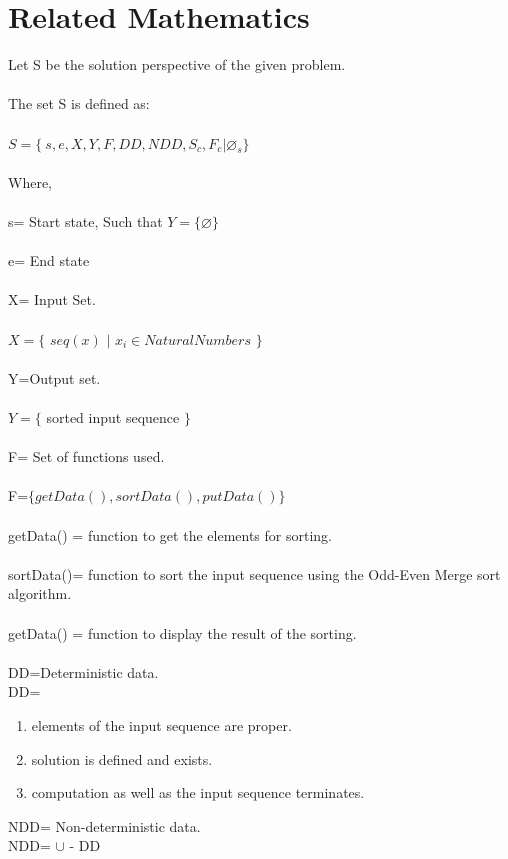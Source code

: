 \documentclass[10pt,a4paper]{article}
\begin{document}
\section{Related Mathematics}
Let S be the solution perspective of the given problem.
\\\\The set S is defined as:
\\\\$S=\lbrace\ s,e,X,Y,F,DD,NDD,S_{c},F_{c}|\varnothing_{s}\rbrace$
\\\\Where,
\\\\s= Start state,  Such that $Y=\lbrace \varnothing \rbrace$ 
\\\\e= End state 
\\\\X= Input Set.
\\\\$X=\lbrace$ $seq(x)$ $\mid$ $x_i \in Natural Numbers$ $\rbrace$
\\\\Y=Output set.
\\\\$Y=\lbrace $ sorted input sequence $ \rbrace $
\\\\F= Set of functions used.
\\\\F=$\lbrace getData(), sortData(), putData() \rbrace$
\\\\getData() = function to get the elements for sorting.
\\\\sortData()= function to sort the input sequence using the Odd-Even Merge sort algorithm.
\\\\getData() = function to display the result of the sorting.
\\\\DD=Deterministic data.
\\DD=
\begin{enumerate}
\item elements of the input sequence are proper.
\item solution is defined and exists.
\item computation as well as the input sequence terminates.
\end{enumerate}
NDD= Non-deterministic data.
\\NDD= $\cup$ - DD
\end{document}

